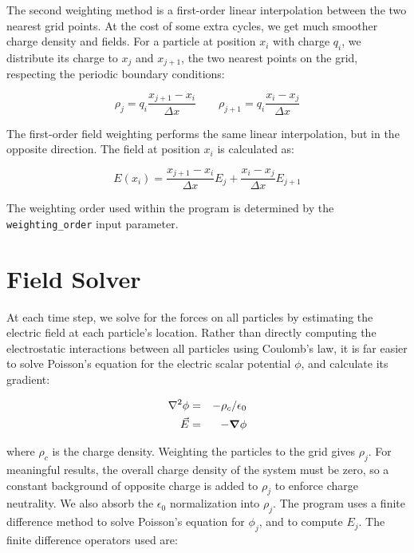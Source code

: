 \documentclass[%
 reprint,
 amsmath,amssymb,
 aps,
]{revtex4-2}
\begin{document}
The second weighting method is a first-order linear interpolation between the two nearest grid points. At the cost of some extra cycles, we get much smoother charge density and fields. For a particle at position $x_i$ with charge $q_i$, we distribute its charge to $x_j$ and $x_{j+1}$, the two nearest points on the grid, respecting the periodic boundary conditions:

\begin{equation}
\rho_j = q_i \frac{x_{j+1} - x_i}{\Delta x} \qquad \rho_{j+1} = q_i \frac{x_i - x_j}{\Delta x}
\end{equation}

The first-order field weighting performs the same linear interpolation, but in the opposite direction. The field  at position $x_i$ is calculated as:

\begin{equation}
E(x_i) = \frac{x_{j+1} - x_i}{\Delta x} E_j + \frac{x_i - x_j}{\Delta x} E_{j + 1}
\end{equation}

The weighting order used within the program is determined by the \texttt{weighting\_order} input parameter.

\section{Field Solver}

At each time step, we solve for the forces on all particles by estimating the electric field at each particle's location. Rather than directly computing the electrostatic interactions between all particles using Coulomb's law, it is far easier to solve Poisson's equation for the electric scalar potential $\phi$, and calculate its gradient:

\begin{eqnarray}
\nabla ^2 \phi & = & - \rho_c / \epsilon_0 \\
\vec E & = & - \grad \phi
\end{eqnarray}

where $\rho_c$ is the charge density. Weighting the particles to the grid gives $\rho_j$. For meaningful results, the overall charge density of the system must be zero, so a constant background of opposite charge is added to $\rho_j$ to enforce charge neutrality. We also absorb the $\epsilon_0$ normalization into $\rho_j$. The program uses a finite difference method to solve Poisson's equation for $\phi_j$, and to compute $E_j$. The finite difference operators used are:
\end{document}
